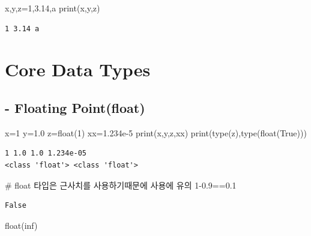 \documentclass[
  a4paper,
  DIV=11,
  numbers=noendperiod]{scrreprt}
\newenvironment{Shaded}{\begin{snugshade}}{\end{snugshade}}
\newcommand{\BuiltInTok}[1]{\textcolor[rgb]{0.00,0.23,0.31}{#1}}
\newcommand{\CommentTok}[1]{\textcolor[rgb]{0.37,0.37,0.37}{#1}}
\newcommand{\DecValTok}[1]{\textcolor[rgb]{0.68,0.00,0.00}{#1}}
\newcommand{\FloatTok}[1]{\textcolor[rgb]{0.68,0.00,0.00}{#1}}
\newcommand{\NormalTok}[1]{\textcolor[rgb]{0.00,0.23,0.31}{#1}}
\newcommand{\OperatorTok}[1]{\textcolor[rgb]{0.37,0.37,0.37}{#1}}
\newcommand{\StringTok}[1]{\textcolor[rgb]{0.13,0.47,0.30}{#1}}
\newcommand{\VariableTok}[1]{\textcolor[rgb]{0.07,0.07,0.07}{#1}}
\begin{document}
\begin{Shaded}
\begin{Highlighting}[]
\NormalTok{x,y,z}\OperatorTok{=}\DecValTok{1}\NormalTok{,}\FloatTok{3.14}\NormalTok{,}\StringTok{\textquotesingle{}a\textquotesingle{}}
\BuiltInTok{print}\NormalTok{(x,y,z)}
\end{Highlighting}
\end{Shaded}

\begin{verbatim}
1 3.14 a
\end{verbatim}

\section{Core Data Types}\label{core-data-types}

\subsection{- Floating Point(float)}\label{floating-pointfloat}

\begin{Shaded}
\begin{Highlighting}[]
\NormalTok{x}\OperatorTok{=}\DecValTok{1}
\NormalTok{y}\OperatorTok{=}\FloatTok{1.0}
\NormalTok{z}\OperatorTok{=}\BuiltInTok{float}\NormalTok{(}\DecValTok{1}\NormalTok{)}
\NormalTok{xx}\OperatorTok{=}\FloatTok{1.234e{-}5}
\BuiltInTok{print}\NormalTok{(x,y,z,xx)}
\BuiltInTok{print}\NormalTok{(}\BuiltInTok{type}\NormalTok{(z),}\BuiltInTok{type}\NormalTok{(}\BuiltInTok{float}\NormalTok{(}\VariableTok{True}\NormalTok{)))}
\end{Highlighting}
\end{Shaded}

\begin{verbatim}
1 1.0 1.0 1.234e-05
<class 'float'> <class 'float'>
\end{verbatim}

\begin{Shaded}
\begin{Highlighting}[]
\CommentTok{\# float 타입은 근사치를 사용하기때문에 사용에 유의}
\DecValTok{1}\OperatorTok{{-}}\FloatTok{0.9}\OperatorTok{==}\FloatTok{0.1}
\end{Highlighting}
\end{Shaded}

\begin{verbatim}
False
\end{verbatim}

\begin{Shaded}
\begin{Highlighting}[]
\BuiltInTok{float}\NormalTok{(}\StringTok{\textquotesingle{}inf\textquotesingle{}}\NormalTok{)}
\end{Highlighting}
\end{Shaded}
\end{document}
